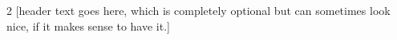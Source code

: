 \documentclass{article}
\begin{document}
\begin{multicols}{2}
[header text goes here, which is completely optional but can sometimes look nice, if it makes sense to have it.]
\Blindtext
\end{multicols}
\end{document}
